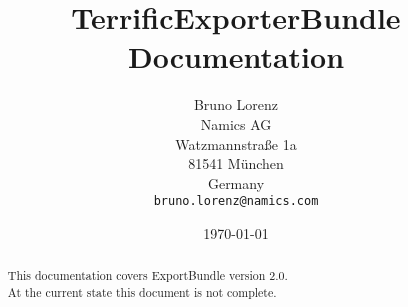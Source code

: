 \documentclass{article}
\title{TerrificExporterBundle Documentation}
\author{Bruno Lorenz\\
  Namics AG\\
  Watzmannstraße 1a\\
  81541 München\\
  Germany\\
  \texttt{bruno.lorenz@namics.com}}
\date{\today}
\begin{document}
\begin{abstract}
    \Large This documentation covers ExportBundle version 2.0.\\
    \Large At the current state this document is not complete.
\end{abstract}

\tableofcontents
\newpage










\end{document}
